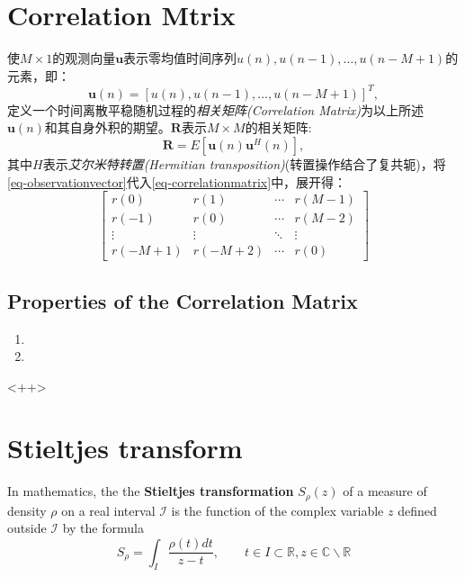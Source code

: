 \section{Correlation Mtrix}
使$M\times 1$的观测向量$\mathbf{u}$表示零均值时间序列$u(n),u(n-1),\dots,u(n-M+1)$的元素，即：
\begin{equation}
    \mathbf{u}(n) = \left[ u(n),u(n-1),\dots,u(n-M+1) \right]^T,
    \label{eq-observationvector}
\end{equation}
定义一个时间离散平稳随机过程的\emph{\textcolor[rgb]{1,0,0}{相关矩阵(Correlation Matrix)}}为以上所述$\mathbf{u}(n)$和其自身外积的期望。$\mathbf{R}$表示$M\times M$的相关矩阵:
\begin{equation}
    \mathbf{R} = E[\mathbf{u}(n)\mathbf{u}^H(n)],
    \label{eq-correlationmatrix}
\end{equation}
其中$H$表示\emph{\textcolor[rgb]{1,0,0}{艾尔米特转置(Hermitian transposition)}}(转置操作结合了复共轭)，将\cref{eq-observationvector}代入\cref{eq-correlationmatrix}中，展开得：
\begin{equation}
    \left[      
        \begin{array}{cccc}
        r(0) & r(1) & \cdots & r(M-1)\\
        r(-1) & r(0) & \cdots & r(M-2)\\
        \vdots & \vdots & \ddots & \vdots\\
        r(-M+1) & r(-M+2) & \cdots & r(0)
    \end{array}
    \right]
    \label{eq-correlationmatrixexpanded}
\end{equation}
\subsection{Properties of the Correlation Matrix}
\begin{enumerate}
    \item
    \item 
\end{enumerate}<++>

\section{Stieltjes transform}
In mathematics, the the \textbf{\textcolor[rgb]{1,0,0}{Stieltjes transformation}} $S_{\rho}(z)$ of a measure of density $\rho$ on a real interval $\mathcal{I}$ is the function of the complex variable $z$ defined outside $\mathcal{I}$ by the formula
\begin{equation}
    S_{\rho} = \int_I \dfrac{\rho(t) dt}{z-t}, \qquad t \in I \subset \mathbb{R}, z\in \mathbb{C} \backslash \mathbb{R}
    \label{eq-Stieltjes}
\end{equation}

